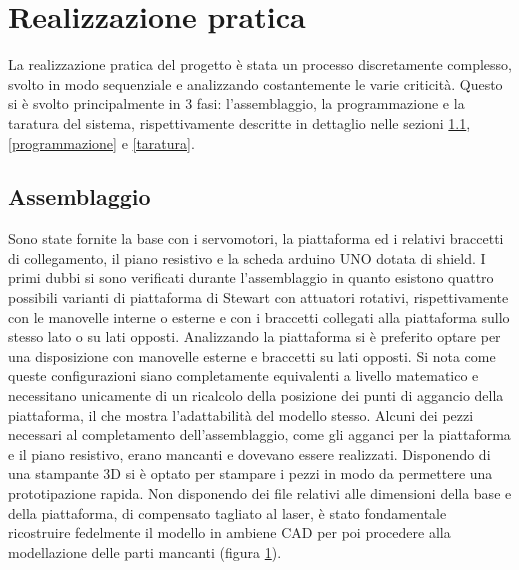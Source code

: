 \documentclass[12pt,twoside,openright]{article}
\begin{document}
\newpage


\section{Realizzazione pratica}
La realizzazione pratica del progetto è stata un processo discretamente complesso, svolto in modo sequenziale e analizzando costantemente le varie criticità. Questo si è svolto principalmente in 3 fasi: l'assemblaggio, la programmazione e la taratura del sistema, rispettivamente descritte in dettaglio nelle sezioni \ref{assemblaggio}, \ref{programmazione} e \ref{taratura}.

\subsection{Assemblaggio}\label{assemblaggio}
Sono state fornite la base con i servomotori, la piattaforma ed i relativi braccetti di collegamento, il piano resistivo e la scheda arduino UNO dotata di shield. I primi dubbi si sono verificati durante l'assemblaggio in quanto esistono quattro possibili varianti di piattaforma di Stewart con attuatori rotativi, rispettivamente con le manovelle interne o esterne e con i braccetti collegati alla piattaforma sullo stesso lato o su lati opposti. Analizzando la piattaforma si è preferito optare per una disposizione con manovelle esterne e braccetti su lati opposti. Si nota come queste configurazioni siano completamente equivalenti a livello matematico e necessitano unicamente di un ricalcolo della posizione dei punti di aggancio della piattaforma, il che mostra l'adattabilità del modello stesso. Alcuni dei pezzi necessari al completamento dell'assemblaggio, come gli agganci per la piattaforma e il piano resistivo, erano mancanti e dovevano essere realizzati. Disponendo di una stampante 3D si è optato per stampare i pezzi in modo da permettere una prototipazione rapida. Non disponendo dei file relativi alle dimensioni della base e della piattaforma, di compensato tagliato al laser, è stato fondamentale ricostruire fedelmente il modello in ambiene CAD per poi procedere alla modellazione delle parti mancanti (figura \ref{}). 
\end{document}
